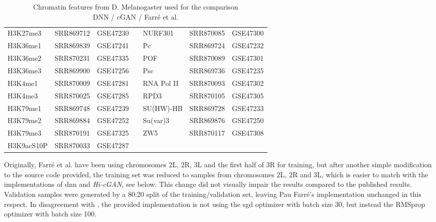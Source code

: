 \begin{table}[htb]
\begin{tabular}{lllllll}
H3K27me3         & SRR869712           & GSE47230         &  & NURF301          & SRR870085 & GSE47300 \\
H3K36me1         & SRR869839           & GSE47241         &  & Pc               & SRR869724 & GSE47232 \\
H3K36me2         & SRR870231           & GSE47335         &  & POF              & SRR870089 & GSE47301 \\
H3K36me3         & SRR869900           & GSE47256         &  & Psc              & SRR869736 & GSE47235 \\
H3K4me1          & SRR870009           & GSE47281         &  & RNA Pol II       & SRR870093 & GSE47302 \\
H3K4me3          & SRR870025           & GSE47285         &  & RPD3             & SRR870105 & GSE47305 \\
H3K79me1         & SRR869748           & GSE47239         &  & SU(HW)-HB        & SRR869728 & GSE47233 \\
H3K79me2         & SRR869884           & GSE47252         &  & Su(var)3         & SRR869876 & GSE47250 \\
H3K79me3         & SRR870191           & GSE47325         &  & ZW5              & SRR870117 & GSE47308 \\
H3K9acS10P       & SRR870033           & GSE47287         &  &                  &           &          \\ \hline
\end{tabular}
\caption[Chromatin features from D. Melanogaster used for the comparison DNN / cGAN / Farré et al. \cite{Farre2018a}]{Chromatin features from D. Melanogaster used for the comparison\\DNN / cGAN / Farré et al. \cite{Farre2018a}}
\label{tab:methods:features_farre}
\end{table}

Originally, Farré et al. have been using chromosomes 2L, 2R, 3L and the first half of 3R for training, 
but after another simple modification to the source code provided, the training set was reduced to samples from chromosomes 2L, 2R and 3L,
which is easier to match with the implementations of \acrshort{dnn} and \emph{Hi-cGAN}, see below. 
This change did not visually impair the results compared to the published results.
Validation samples were generated by a 80:20 split of the training/validation set, leaving Pau Farr\'e's implementation unchanged in this respect.
In disagreement with \cite{Farre2018a}, the provided implementation is not using the \acrshort{sgd} optimizer with batch size 30,
but instead the RMSprop optimizer with batch size 100.

